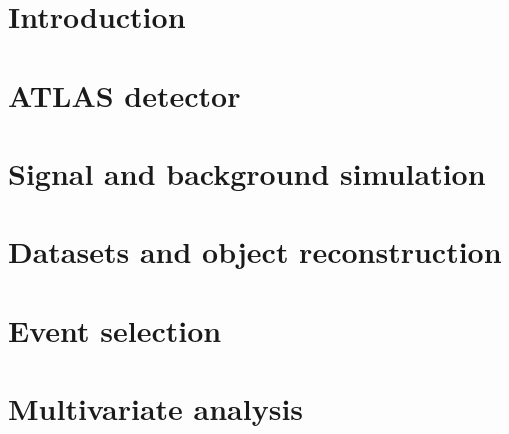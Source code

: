 \documentclass[PAPER, american,coverpage,texlive=2016, english]{\ATLASLATEXPATH atlasdoc}
\begin{document}
\maketitle

\section{Introduction}
\label{sec:intro}

\section{ATLAS detector}
\label{sec:detector}


\section{Signal and background simulation}
\label{sec:simulation}

\section{Datasets and object reconstruction}
\label{sec:objects}


\section{Event selection}
\label{sec:selection}




\section{Multivariate analysis}
\label{sec:mva}

\end{document}
